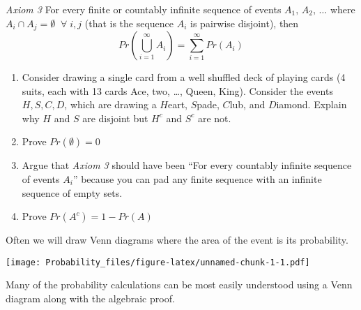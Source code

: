 \documentclass[]{book}
\begin{document}
\emph{Axiom 3} For every finite or countably infinite sequence of events
\(A_1, \, A_2, \, \dots\) where
\(A_i \cap A_j = \emptyset \;\;\forall\; i,j\) (that is the sequence
\(A_i\) is pairwise disjoint), then
\[Pr\left( \bigcup_{i=1}^\infty A_i \right) = \sum_{i=1}^\infty Pr\left(A_i\right)\]

\begin{enumerate}
\def\labelenumi{\arabic{enumi}.}
\item
  Consider drawing a single card from a well shuffled deck of playing
  cards (4 suits, each with 13 cards Ace, two, \ldots{}, Queen, King).
  Consider the events \(H,S,C,D\), which are drawing a \(H\)eart,
  \(S\)pade, \(C\)lub, and \(D\)iamond. Explain why \(H\) and \(S\) are
  disjoint but \(H^c\) and \(S^c\) are not.
\item
  Prove \(Pr(\emptyset) = 0\)
\item
  Argue that \emph{Axiom 3} should have been ``For every countably
  infinite sequence of events \(A_i\)'' because you can pad any finite
  sequence with an infinite sequence of empty sets.
\item
  Prove \(Pr(A^c) = 1 - Pr(A)\)
\end{enumerate}

Often we will draw Venn diagrams where the area of the event is its
probability.

\texttt{[image: Probability\_files/figure-latex/unnamed-chunk-1-1.pdf]}

Many of the probability calculations can be most easily understood using
a Venn diagram along with the algebraic proof.
\end{document}
